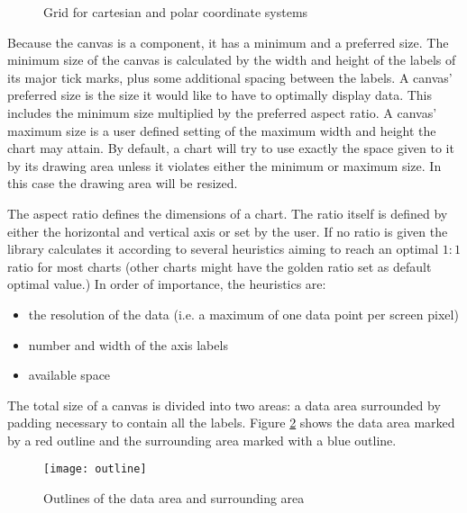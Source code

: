 \begin{figure}[H]
	\centering
	\caption{Grid for cartesian and polar coordinate systems}
	\label{gridon}
\end{figure}

Because the canvas is a component, it has a minimum and a preferred size. The minimum size of the canvas is calculated by the width and height of the labels of its major tick marks, plus some additional spacing between the labels. A canvas' preferred size is the size it would like to have to optimally display data. This includes the minimum size multiplied by the preferred aspect ratio. A canvas' maximum size is a user defined setting of the maximum width and height the chart may attain. By default, a chart will try to use exactly the space given to it by its drawing area unless it violates either the minimum or maximum size. In this case the drawing area will be resized.

The aspect ratio defines the dimensions of a chart. The ratio itself is defined by either the horizontal and vertical axis or set by the user. If no ratio is given the library calculates it according to several heuristics aiming to reach an optimal $1:1$ ratio for most charts (other charts might have the golden ratio \cite{weisstein09, few04} set as default optimal value.) In order of importance, the heuristics are: 
\begin{itemize}
\item the resolution of the data (i.e. a maximum of one data point per screen pixel)
\item number and width of the axis labels
\item available space
\end{itemize}
The total size of a canvas is divided into two areas: a data area surrounded by padding necessary to contain all the labels. Figure \ref{outline} shows the data area marked by a red outline and the surrounding area marked with a blue outline.
\begin{figure}[h!]
\centering
\texttt{[image: outline]}
\caption{Outlines of the data area and surrounding area}
\label{outline}
\end{figure}
